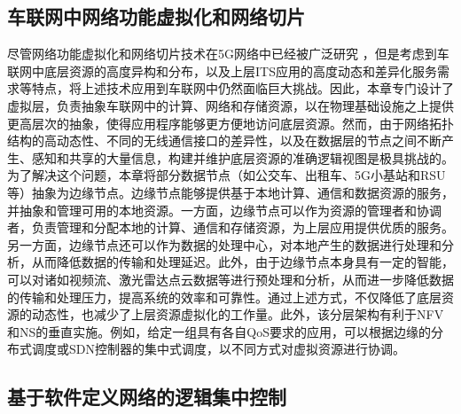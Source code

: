 \subsection[\hspace{-2pt}车联网中网络功能虚拟化和网络切片]{{ \hspace{-8pt}车联网中网络功能虚拟化和网络切片}}

尽管网络功能虚拟化和网络切片技术在5G网络中已经被广泛研究 \cite{zhu2021wang}，但是考虑到车联网中底层资源的高度异构和分布，以及上层ITS应用的高度动态和差异化服务需求等特点，将上述技术应用到车联网中仍然面临巨大挑战。因此，本章专门设计了虚拟层，负责抽象车联网中的计算、网络和存储资源，以在物理基础设施之上提供更高层次的抽象，使得应用程序能够更方便地访问底层资源。然而，由于网络拓扑结构的高动态性、不同的无线通信接口的差异性，以及在数据层的节点之间不断产生、感知和共享的大量信息，构建并维护底层资源的准确逻辑视图是极具挑战的。为了解决这个问题，本章将部分数据节点（如公交车、出租车、5G小基站和RSU等）抽象为边缘节点。边缘节点能够提供基于本地计算、通信和数据资源的服务，并抽象和管理可用的本地资源。一方面，边缘节点可以作为资源的管理者和协调者，负责管理和分配本地的计算、通信和存储资源，为上层应用提供优质的服务。另一方面，边缘节点还可以作为数据的处理中心，对本地产生的数据进行处理和分析，从而降低数据的传输和处理延迟。此外，由于边缘节点本身具有一定的智能，可以对诸如视频流、激光雷达点云数据等进行预处理和分析，从而进一步降低数据的传输和处理压力，提高系统的效率和可靠性。通过上述方式，不仅降低了底层资源的动态性，也减少了上层资源虚拟化的工作量。此外，该分层架构有利于NFV和NS的垂直实施。例如，给定一组具有各自QoS要求的应用，可以根据边缘的分布式调度或SDN控制器的集中式调度，以不同方式对虚拟资源进行协调。

\subsection[\hspace{-2pt}基于软件定义网络的逻辑集中控制]{{ \hspace{-8pt}基于软件定义网络的逻辑集中控制}}

